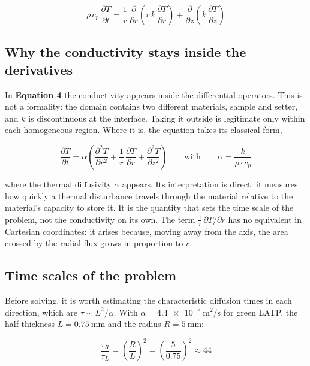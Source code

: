 \documentclass[11pt,a4paper]{article}
\newcommand{\ecu}[1]{\textbf{\textcolor{uji}{Equation #1}}}
\begin{document}
\begin{equation}
\boxed{\;
\rho\, c_p\, \frac{\partial T}{\partial t}
= \frac{1}{r}\, \frac{\partial}{\partial r}
  \left( r\, k\, \frac{\partial T}{\partial r} \right)
+ \frac{\partial}{\partial z}
  \left( k\, \frac{\partial T}{\partial z} \right)
\;}
\end{equation}

\subsection{Why the conductivity stays inside the derivatives}

In \ecu{4} the conductivity appears inside the differential operators. This
is not a formality: the domain contains two different materials, sample and
setter, and $k$ is discontinuous at the interface. Taking it outside is
legitimate only within each homogeneous region. Where it is, the equation
takes its classical form,

\begin{equation}
\frac{\partial T}{\partial t}
= \alpha \left( \frac{\partial^{2} T}{\partial r^{2}}
+ \frac{1}{r}\, \frac{\partial T}{\partial r}
+ \frac{\partial^{2} T}{\partial z^{2}} \right)
\qquad \text{with} \qquad
\alpha = \frac{k}{\rho \cdot c_p}
\end{equation}

where the thermal diffusivity $\alpha$ appears. Its interpretation is
direct: it measures how quickly a thermal disturbance travels through the
material relative to the material's capacity to store it. It is the
quantity that sets the time scale of the problem, not the conductivity on
its own. The term $\tfrac{1}{r}\,\partial T/\partial r$ has no equivalent
in Cartesian coordinates: it arises because, moving away from the axis, the
area crossed by the radial flux grows in proportion to $r$.

\subsection{Time scales of the problem}

Before solving, it is worth estimating the characteristic diffusion times in
each direction, which are $\tau \sim L^{2}/\alpha$. With
$\alpha = \SI{4.4e-7}{\meter\squared\per\second}$ for green LATP, the
half-thickness $L = \SI{0.75}{\milli\meter}$ and the radius
$R = \SI{5}{\milli\meter}$:

\begin{equation}
\frac{\tau_{R}}{\tau_{L}} = \left( \frac{R}{L} \right)^{2}
= \left( \frac{5}{0.75} \right)^{2} \approx 44
\end{equation}
\end{document}
